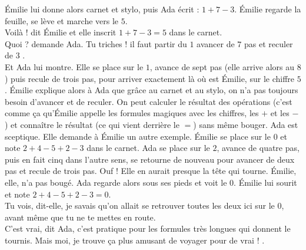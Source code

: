 Émilie lui donne alors carnet et stylo, puis Ada écrit : $1 + 7 - 3 $. Émilie regarde la feuille, se lève et marche vers le $5$.\\
\guillemotleft Voilà ! dit Émilie et elle inscrit $1 + 7 - 3 = 5$ dans le carnet.\\
\mdash Quoi ? demande Ada. Tu triches ! il faut partir du $1$ avancer de $7$ pas et reculer de $3$ \guillemotright.\\
Et Ada lui montre. Elle se place sur le $1$, avance de sept pas (elle arrive alors au $8$) puis recule de trois pas, pour arriver exactement là où est Émilie, sur le chiffre $5$. Émilie explique alors à Ada que grâce au carnet et au stylo, on n’a pas toujours besoin d’avancer et de reculer. On peut calculer le résultat des opérations (c’est comme ça qu’Émilie appelle les formules magiques avec les chiffres, les $+$ et les $-$) et connaître le résultat (ce qui vient derrière le $=$) sans même bouger. Ada est sceptique. Elle demande à Émilie un autre exemple. Émilie se place sur le $0$ et note $2 + 4 - 5 + 2 - 3$ dans le carnet. Ada se place sur le $2$, avance de quatre pas, puis en fait cinq dans l’autre sens, se retourne de nouveau pour avancer de deux pas et recule de trois pas. Ouf ! Elle en aurait presque la tête qui tourne. Émilie, elle, n’a pas bougé. Ada regarde alors sous ses pieds et voit le $0$. Émilie lui sourit et note $2 + 4 - 5 + 2 - 3 = 0$.\\
\guillemotleft Tu vois, dit-elle, je savais qu’on allait se retrouver toutes les deux ici sur le 0, avant même que tu ne te mettes en route.\\
\mdash C’est vrai, dit Ada, c’est pratique pour les formules très longues qui donnent le tournis. Mais moi, je trouve ça plus amusant de voyager pour de vrai ! \guillemotright.

%    
